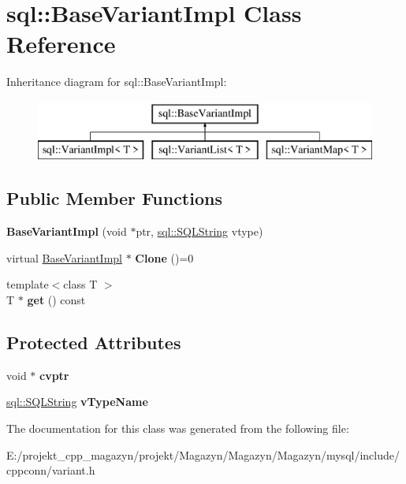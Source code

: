 \hypertarget{classsql_1_1_base_variant_impl}{}\section{sql\+:\+:Base\+Variant\+Impl Class Reference}
\label{classsql_1_1_base_variant_impl}
Inheritance diagram for sql\+:\+:Base\+Variant\+Impl\+:\begin{figure}[H]
\begin{center}
\leavevmode
\includegraphics[height=2.000000cm]{classsql_1_1_base_variant_impl}
\end{center}
\end{figure}
\subsection*{Public Member Functions}
\begin{DoxyCompactItemize}
\item 
\hypertarget{classsql_1_1_base_variant_impl_a87a2cb65f36f91d88b83521dd2315b5e}{}\label{classsql_1_1_base_variant_impl_a87a2cb65f36f91d88b83521dd2315b5e} 
{\bfseries Base\+Variant\+Impl} (void $\ast$ptr, \hyperlink{classsql_1_1_s_q_l_string}{sql\+::\+S\+Q\+L\+String} vtype)
\item 
\hypertarget{classsql_1_1_base_variant_impl_a8e53085bd523fe88f18af8ad65ff72fa}{}\label{classsql_1_1_base_variant_impl_a8e53085bd523fe88f18af8ad65ff72fa} 
virtual \hyperlink{classsql_1_1_base_variant_impl}{Base\+Variant\+Impl} $\ast$ {\bfseries Clone} ()=0
\item 
\hypertarget{classsql_1_1_base_variant_impl_a78ccc21b2495cfa8ac7f17a167e88594}{}\label{classsql_1_1_base_variant_impl_a78ccc21b2495cfa8ac7f17a167e88594} 
{\footnotesize template$<$class T $>$ }\\T $\ast$ {\bfseries get} () const
\end{DoxyCompactItemize}
\subsection*{Protected Attributes}
\begin{DoxyCompactItemize}
\item 
\hypertarget{classsql_1_1_base_variant_impl_ab438bc57eece9802274e8c61393b3d73}{}\label{classsql_1_1_base_variant_impl_ab438bc57eece9802274e8c61393b3d73} 
void $\ast$ {\bfseries cvptr}
\item 
\hypertarget{classsql_1_1_base_variant_impl_ae5c0cd2898b6f41624e4c601a3d48810}{}\label{classsql_1_1_base_variant_impl_ae5c0cd2898b6f41624e4c601a3d48810} 
\hyperlink{classsql_1_1_s_q_l_string}{sql\+::\+S\+Q\+L\+String} {\bfseries v\+Type\+Name}
\end{DoxyCompactItemize}


The documentation for this class was generated from the following file\+:\begin{DoxyCompactItemize}
\item 
E\+:/projekt\+\_\+cpp\+\_\+magazyn/projekt/\+Magazyn/\+Magazyn/\+Magazyn/mysql/include/cppconn/variant.\+h\end{DoxyCompactItemize}

